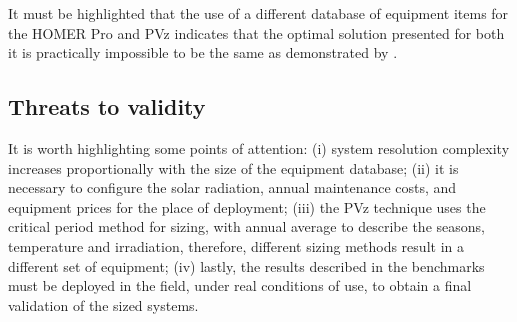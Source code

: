 \documentclass[review]{elsarticle}
\begin{document}
It must be highlighted that the use of a different database of equipment items for the HOMER Pro and PVz indicates that the optimal solution presented for both it is practically impossible to be the same as demonstrated by \cite{Alsadi2018}. 

\subsection{Threats to validity} 

It is worth highlighting some points of attention: (i) system resolution complexity increases proportionally with the size of the equipment database; (ii) it is necessary to configure the solar radiation, annual maintenance costs, and equipment prices for the place of deployment; (iii) the PVz technique uses the critical period method for sizing, with annual average to describe the seasons, temperature and irradiation, therefore, different sizing methods result in a different set of equipment; (iv) lastly, the results described in the benchmarks must be deployed in the field, under real conditions of use, to obtain a final validation of the sized systems.
\end{document}

